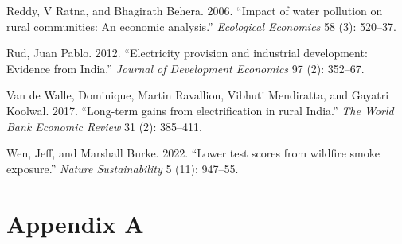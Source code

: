 \documentclass[
]{article}
\newlength{\cslhangindent}
\newlength{\cslentryspacingunit} %
\newenvironment{CSLReferences}[2] %
 {%
  \setlength{\parindent}{0pt}
  \ifodd #1
  \let\oldpar\par
  \def\par{\hangindent=\cslhangindent\oldpar}
  \fi
  \setlength{\parskip}{#2\cslentryspacingunit}
 }%
 {}
\begin{document}
\begin{CSLReferences}{1}{0}
\leavevmode{}%
Reddy, V Ratna, and Bhagirath Behera. 2006. {``{Impact of water pollution on rural communities: An economic analysis}.''} \emph{{Ecological Economics}} 58 (3): 520--37.

\leavevmode{}%
Rud, Juan Pablo. 2012. {``{Electricity provision and industrial development: Evidence from India}.''} \emph{{Journal of Development Economics}} 97 (2): 352--67.

\leavevmode{}%
Van de Walle, Dominique, Martin Ravallion, Vibhuti Mendiratta, and Gayatri Koolwal. 2017. {``{Long-term gains from electrification in rural India}.''} \emph{{The World Bank Economic Review}} 31 (2): 385--411.

\leavevmode{}%
Wen, Jeff, and Marshall Burke. 2022. {``{Lower test scores from wildfire smoke exposure}.''} \emph{{Nature Sustainability}} 5 (11): 947--55.

\end{CSLReferences}

\FloatBarrier
\newpage

\hypertarget{appendix-a}{%
\section*{Appendix A}\label{appendix-a}}

\setcounter{table}{0} \renewcommand{\thetable}{A\arabic{table}} \setcounter{figure}{0} \renewcommand{\thefigure}{A\arabic{figure}} 
\FloatBarrier
\end{document}
